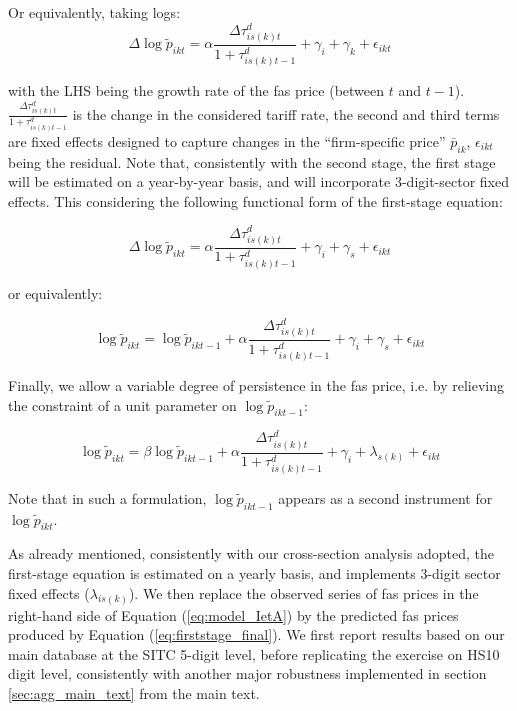 \documentclass[a4paper,11pt]{article}
\begin{document}
Or equivalently, taking logs:
$$\Delta \log \widetilde{p}_{ikt}= \alpha\frac{\Delta \tau^d_{is(k)t}}{1+\tau_{is(k)t-1}^d} +\gamma_{i} +\gamma_{k}+\epsilon_{ikt}$$


\noindent with the LHS being the growth rate of the fas price (between $t$ and $t-1$). $\frac{\Delta \tau^d_{is(k)t}}{1+\tau_{is(k)t-1}^d}$ is the change in the considered tariff rate, the second and third terms are fixed effects designed to capture changes in the ``firm-specific price'' $\bar{p}_{ik}$, $\epsilon_{ikt}$ being the residual. Note that, consistently with the second stage, the first stage will be estimated on a year-by-year basis, and will incorporate 3-digit-sector fixed effects. This considering the following functional form of the first-stage equation:

\begin{equation}
\Delta \log \widetilde{p}_{ikt} = \alpha\frac{\Delta \tau^d_{is(k)t}}{1+\tau_{is(k)t-1}^d} +\gamma_{i} +\gamma_{s}+\epsilon_{ikt} \label{eq:firststage_Deltalog}
\end{equation}

or equivalently:

\begin{equation}
\log \widetilde{p}_{ikt} = \log \widetilde{p}_{ikt-1} + \alpha\frac{\Delta \tau^d_{is(k)t}}{1+\tau_{is(k)t-1}^d} +\gamma_{i} +\gamma_{s}+\epsilon_{ikt} \label{eq:firststage_Deltalog_bis}
\end{equation}

Finally, we allow a variable degree of persistence in the fas price, i.e. by relieving the constraint of a unit parameter on $\log \widetilde{p}_{ikt-1}$:


\begin{equation}
\log \widetilde{p}_{ikt} = \beta\log \widetilde{p}_{ikt-1} + \alpha\frac{\Delta \tau^d_{is(k)t}}{1+\tau_{is(k)t-1}^d} +\gamma_{i} +\lambda_{s(k)}+\epsilon_{ikt} \label{eq:firststage_final}
\end{equation}

Note that in such a formulation, $\log \widetilde{p}_{ikt-1}$ appears as a second instrument for $\log \widetilde{p}_{ikt}$.

As already mentioned, consistently with our cross-section analysis adopted, the first-stage equation is estimated on a yearly basis, and implements 3-digit sector fixed effects ($\lambda_{is(k)}$). We then replace the observed series of fas prices in the right-hand side of Equation (\ref{eq:model_IetA}) by the predicted fas prices produced by Equation (\ref{eq:firststage_final}). We first report results based on our main database at the SITC 5-digit level, before replicating the exercise on HS10 digit level, consistently with another major robustness implemented in section \ref{sec:agg_main_text} from the main text.
\end{document}

